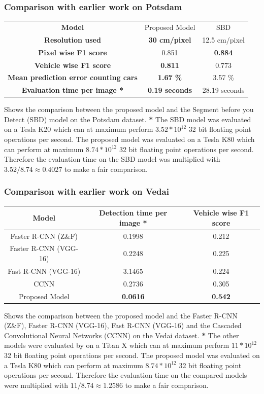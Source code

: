 \documentclass[aspectratio=1610]{beamer}
\begin{document}
\begin{frame}
  \frametitle{\hfill Comparison with earlier work on Potsdam}
\begin{tabular}{|c | c | c|}
\hline
\textbf{Model} & Proposed Model & SBD \\
\textbf{Resolution used} & \textbf{30 cm/pixel} & 12.5 cm/pixel\\
\textbf{Pixel wise F1 score} & 0.851 & \textbf{0.884}\\
\textbf{Vehicle wise F1 score} & \textbf{0.811} &  0.773\\
\textbf{Mean prediction error counting cars} & \textbf{1.67 \%} &  3.57 \%\\
\textbf{Evaluation time per image *} & \textbf{0.19 seconds} &  28.19 seconds\\
\hline
\end{tabular}\caption{Shows the comparison between the proposed model and the Segment before you Detect (SBD) model \parencite{audebert_usability_2016} on the Potsdam dataset. \textbf{*} The SBD model was evaluated on a Tesla K20 which can at maximum perform $3.52*10^{12}$ 32 bit floating point operations per second. The proposed model was evaluated on a Tesla K80 which can perform at maximum $8.74*10^{12}$ 32 bit floating point operations per second. Therefore the evaluation time on the SBD model was multiplied with $3.52/8.74\approx0.4027$ to make a fair comparison.}
\end{frame}


\begin{frame}
  \frametitle{\hfill Comparison with earlier work on Vedai}
\begin{tabular}{|c | c c|}
\hline
\textbf{Model} & \textbf{Detection time per image *}  & \textbf{Vehicle wise F1 score}\\
\hline
Faster R-CNN (Z\&F) & 0.1998 & 0.212\\
Faster R-CNN (VGG-16) & 0.2248 & 0.225\\
Fast R-CNN (VGG-16) & 3.1465 &  0.224\\
CCNN &0.2736 &  0.305\\
Proposed Model & \textbf{0.0616} & \textbf{0.542}\\
\hline
\end{tabular}
\caption{Shows the comparison between the proposed model and the Faster R-CNN (Z\&F), Faster R-CNN (VGG-16), Fast R-CNN (VGG-16) \cite{zeiler_visualizing_2014} and the Cascaded Convolutional Neural Networks (CCNN) \cite{zhong_robust_2017-1} on the Vedai dataset. \textbf{*} The other models were evaluated by \cite{zhong_robust_2017-1} on a Titan X which can at maximum perform $11*10^{12}$ 32 bit floating point operations per second. The proposed model was evaluated on a Tesla K80 which can perform at maximum $8.74*10^{12}$ 32 bit floating point operations per second. Therefore the evaluation time on the compared models were multiplied with $11/8.74\approx1.2586$ to make a fair comparison.}
\end{frame}
\end{document}
